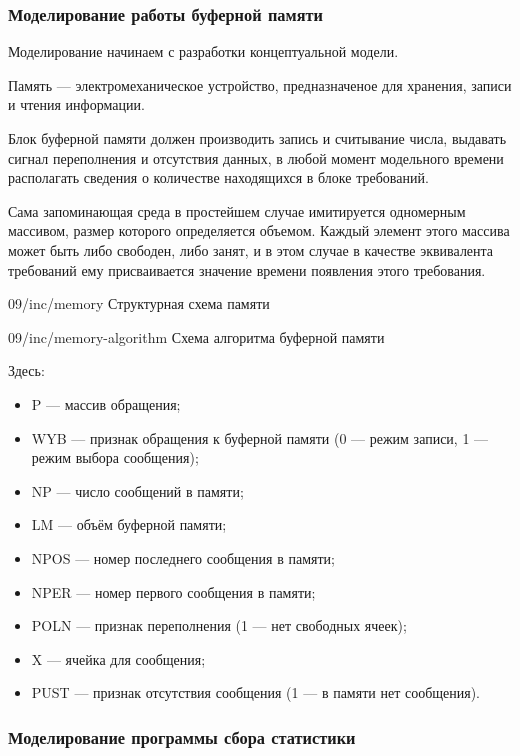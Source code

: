 \subsubsection{Моделирование работы буферной памяти}

Моделирование начинаем с разработки концептуальной модели.

\begin{dd}
    Память --- электромеханическое устройство, предназначеное для хранения, записи и чтения информации.
\end{dd}

Блок буферной памяти должен производить запись и считывание числа, выдавать сигнал переполнения и отсутствия данных, в любой момент модельного времени располагать сведения о количестве находящихся в блоке требований.

Сама запоминающая среда в простейшем случае имитируется одномерным массивом, размер которого определяется объемом. Каждый элемент этого массива может быть либо свободен, либо занят, и в этом случае в качестве эквивалента требований ему присваивается значение времени появления этого требования.

\image
{\textwidth}
{09/inc/memory}
{Структурная схема памяти}

\image
{\textwidth}
{09/inc/memory-algorithm}
{Схема алгоритма буферной памяти}

Здесь:

\begin{itemize}
    \item P --- массив обращения;
    \item WYB --- признак обращения к буферной памяти (0 --- режим записи, 1 --- режим
          выбора сообщения);
    \item NP --- число сообщений в памяти;
    \item LM --- объём буферной памяти;
    \item NPOS --- номер последнего сообщения в памяти;
    \item NPER --- номер первого сообщения в памяти;
    \item POLN --- признак переполнения (1 --- нет свободных ячеек);
    \item X --- ячейка для сообщения;
    \item PUST --- признак отсутствия сообщения (1 --- в памяти нет сообщения).
\end{itemize}

\subsubsection{Моделирование программы сбора статистики}

